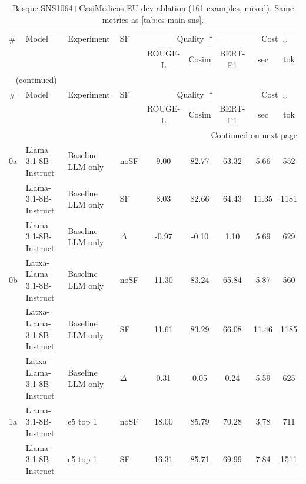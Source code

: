 \begin{scriptsize}
\setlength{\tabcolsep}{3pt}
\setlength{\LTcapwidth}{\linewidth}
\begin{longtable}{l l l l c c c c c}
\caption[Basque Mixed dev ablation]{Basque SNS1064+CasiMedicos EU dev ablation (161 examples, mixed). Same metrics as \autoref{tab:es-main-sns}.} \label{tab:eu-main-mixed} \\
\toprule
\# & Model & Experiment & SF & \multicolumn{3}{c}{Quality $\uparrow$} & \multicolumn{2}{c}{Cost $\downarrow$} \\
\cmidrule(lr){5-7}\cmidrule(lr){8-9}
\multicolumn{1}{l}{} & \multicolumn{1}{l}{} & \multicolumn{1}{l}{} & \multicolumn{1}{l}{} & \multicolumn{1}{c}{ROUGE-L} & \multicolumn{1}{c}{Cosim} & \multicolumn{1}{c}{BERT-F1} & \multicolumn{1}{c}{sec} & \multicolumn{1}{c}{tok} \\
\midrule
\endfirsthead
\multicolumn{9}{l}{\tablename\ \thetable{} (continued)} \\
\toprule
\# & Model & Experiment & SF & \multicolumn{3}{c}{Quality $\uparrow$} & \multicolumn{2}{c}{Cost $\downarrow$} \\
\cmidrule(lr){5-7}\cmidrule(lr){8-9}
\multicolumn{1}{l}{} & \multicolumn{1}{l}{} & \multicolumn{1}{l}{} & \multicolumn{1}{l}{} & \multicolumn{1}{c}{ROUGE-L} & \multicolumn{1}{c}{Cosim} & \multicolumn{1}{c}{BERT-F1} & \multicolumn{1}{c}{sec} & \multicolumn{1}{c}{tok} \\
\midrule
\endhead
\midrule
\multicolumn{9}{r}{Continued on next page} \\
\endfoot
\bottomrule
\endlastfoot
0a & Llama-3.1-8B-Instruct & Baseline LLM only & noSF & 9.00 & 82.77 & 63.32 & 5.66 & 552 \\
 & Llama-3.1-8B-Instruct & Baseline LLM only & SF & 8.03 & 82.66 & 64.43 & 11.35 & 1181 \\
 & Llama-3.1-8B-Instruct & Baseline LLM only & $\Delta$ & -0.97 & -0.10 & 1.10 & 5.69 & 629 \\
0b & Latxa-Llama-3.1-8B-Instruct & Baseline LLM only & noSF & 11.30 & 83.24 & 65.84 & 5.87 & 560 \\
 & Latxa-Llama-3.1-8B-Instruct & Baseline LLM only & SF & 11.61 & 83.29 & 66.08 & 11.46 & 1185 \\
 & Latxa-Llama-3.1-8B-Instruct & Baseline LLM only & $\Delta$ & 0.31 & 0.05 & 0.24 & 5.59 & 625 \\
\dmidrule
1a & Llama-3.1-8B-Instruct & e5 top 1 & noSF & 18.00 & 85.79 & 70.28 & 3.78 & 711 \\
 & Llama-3.1-8B-Instruct & e5 top 1 & SF & 16.31 & 85.71 & 69.99 & 7.84 & 1511 \\

\end{longtable}
\end{scriptsize}
